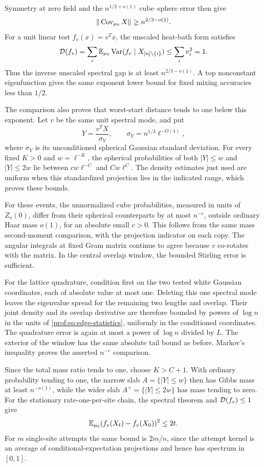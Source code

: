 Symmetry at
zero field and the $n^{1/2+o(1)}$ cube--sphere error then give
\begin{equation}\label{prof:eq:supplementary-covariance}
 \|\operatorname{Cov}_{\mu_0}X\|\ge n^{2/3-o(1)}.
\end{equation}
For a unit linear test $f_v(x)=v^Tx$, the unscaled heat-bath form
satisfies
\[
 \mathcal D(f_v)=\sum_i\mathbb E_{\mu_0}
             \operatorname{Var}(f_v\mid X_{[n]\setminus\{i\}})
 \le\sum_i v_i^2=1.
\]
Thus the inverse unscaled spectral gap is at least
$n^{2/3-o(1)}$.  A top nonconstant eigenfunction gives the same
exponent lower bound for fixed mixing accuracies less than $1/2$.

The comparison also proves that worst-start distance tends to one
below this exponent.  Let $v$ be the same unit spectral mode, and
put
\[
 Y=\frac{v^TX}{\sigma_Y},\qquad
 \sigma_Y=n^{1/3}\ell^{-O(1)},
\]
where $\sigma_Y$ is its unconditioned spherical Gaussian standard
deviation.  For every fixed $K>0$ and $w=\ell^{-K}$, the spherical
probabilities of both $|Y|\le w$ and $|Y|\le2w$ lie between
$cw\ell^{-C}$ and $Cw\ell^C$.  The density estimates just used are
uniform when this standardized projection lies in the indicated
range, which proves these bounds.

For these events, the unnormalized cube probabilities, measured
in units of $Z_{\mathrm o}(0)$, differ from their spherical
counterparts by at most $n^{-c}$, outside ordinary Haar mass
$o(1)$, for an absolute small $c>0$.  This follows from the same
mass second-moment comparison, with the projection indicator on
each copy.  The angular integrals at fixed Gram matrix continue
to agree because $v$ co-rotates with the matrix.  In the central
overlap window, the bounded Stirling error is sufficient.

For
the lattice quadrature, condition first on the two tested white
Gaussian coordinates, each of absolute value at most one.
Deleting this one spectral mode leaves the eigenvalue spread for
the remaining two lengths and overlap.  Their joint density and
its overlap derivative are therefore bounded by powers of
$\log n$ in the units of \eqref{prof:eq:edge-statistics}, uniformly
in the conditioned coordinates.  The quadrature error is again
at most a power of $\log n$ divided by $L$.  The exterior of the
window has the same absolute tail bound as before.  Markov's
inequality proves the asserted $n^{-c}$ comparison.

Since the total mass ratio tends to one, choose $K>C+1$.
With ordinary probability tending to one, the narrow slab
$A=\{|Y|\le w\}$ then has Gibbs mass at least $n^{-o(1)}$, while
the wider slab $A^+=\{|Y|\le2w\}$ has mass tending to zero.
For the stationary rate-one-per-site chain, the spectral theorem
and $\mathcal D(f_v)\le1$ give
\[
 \mathbb E_{\mu_0}(f_v(X_t)-f_v(X_0))^2\le2t.
\]
For $m$ single-site attempts the same bound is $2m/n$, since
the attempt kernel is an average of conditional-expectation
projections and hence has spectrum in $[0,1]$.


